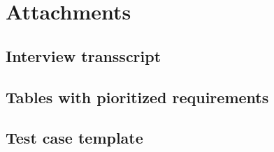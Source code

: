 \documentclass[paper=a4, fontsize=11pt,twoside]{scrartcl}	%
\begin{document}
\section{Attachments}

\subsection{Interview transscript}


\subsection{Tables with pioritized requirements}


\subsection{Test case template}


\end{document}
